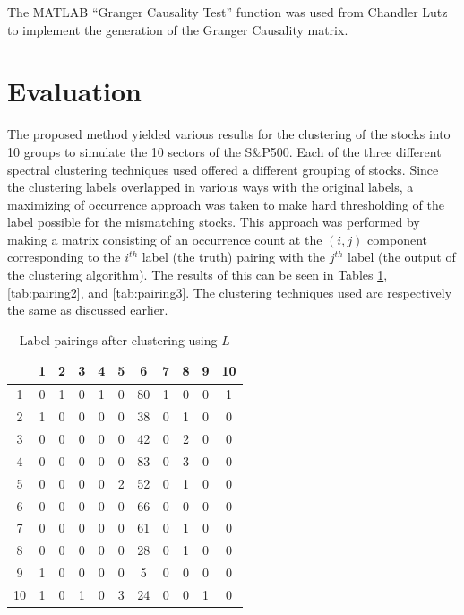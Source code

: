 \documentclass[conference]{IEEEtran}
\begin{document}
The MATLAB ``Granger Causality Test'' function was used from Chandler Lutz to implement the generation of the Granger Causality matrix.



\section{Evaluation}
The proposed method yielded various results for the clustering of the stocks into 10 groups to simulate the 10 sectors of the S\&P500. Each of the three different spectral clustering techniques used offered a different grouping of stocks. Since the clustering labels overlapped in various ways with the original labels, a maximizing of occurrence approach was taken to make hard thresholding of the label possible for the mismatching stocks. This approach was performed by making a matrix consisting of an occurrence count at the $(i,j)$ component corresponding to the $i^{th}$ label (the truth) pairing with the $j^{th}$ label (the output of the clustering algorithm). The results of this can be seen in Tables \ref{tab:pairing1}, \ref{tab:pairing2}, and \ref{tab:pairing3}. The clustering techniques used are respectively the same as discussed earlier.



\begin{table}[h]
\renewcommand{\arraystretch}{1.2}
\caption{Label pairings after clustering using $L$} \label{tab:pairing1}
\centering
\begin{tabular}{c||cccccccccc}
& 1 & 2 & 3 & 4 & 5 & 6 & 7 & 8 & 9 & 10\\
\hline \hline
1 & 0 & 1 & 0 & 1 & 0 & 80 & 1 & 0 & 0 & 1\\ 
2 & 1 & 0 & 0 & 0 & 0 & 38 & 0 & 1 & 0 & 0\\ 
3 & 0 & 0 & 0 & 0 & 0 & 42 & 0 & 2 & 0 & 0\\ 
4 & 0 & 0 & 0 & 0 & 0 & 83 & 0 & 3 & 0 & 0\\ 
5 & 0 & 0 & 0 & 0 & 2 & 52 & 0 & 1 & 0 & 0\\ 
6 & 0 & 0 & 0 & 0 & 0 & 66 & 0 & 0 & 0 & 0\\ 
7 & 0 & 0 & 0 & 0 & 0 & 61 & 0 & 1 & 0 & 0\\ 
8 & 0 & 0 & 0 & 0 & 0 & 28 & 0 & 1 & 0 & 0\\ 
9 & 1 & 0 & 0 & 0 & 0 & 5 & 0 & 0 & 0 & 0\\ 
10 & 1 & 0 & 1 & 0 & 3 & 24 & 0 & 0 & 1 & 0 
\end{tabular}
\end{table}
\end{document}
